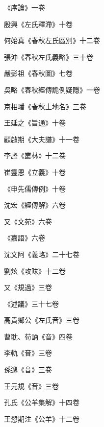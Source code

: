\begin{pinyinscope}
 《序論》一卷



 殷興《左氏釋滯》十卷



 何始真《春秋左氏區別》十二卷



 張沖《春秋左氏義略》三十卷



 嚴彭祖《春秋圖》七卷



 吳略《春秋經傳詭例疑隱》一卷



 京相璠《春秋土地名》三卷



 王延之《旨通》十卷



 顧啟期《大夫譜》十一卷



 李謐《叢林》十二卷



 崔靈恩《立義》十卷



 《申先儒傳例》十卷



 沈宏《經傳解》六卷



 又《文苑》六卷



 《嘉語》六卷



 沈文阿《義略》二十七卷



 劉炫《攻昧》十二卷



 又《規過》三卷



 《述議》三十七卷



 高貴鄉公《左氏音》三卷



 曹耽、荀訥《音》四卷



 李軌《音》三卷



 孫邈《音》三卷



 王元規《音》三卷



 孔氏《公羊集解》十四卷



 王愆期注《公羊》十二卷




\end{pinyinscope}
